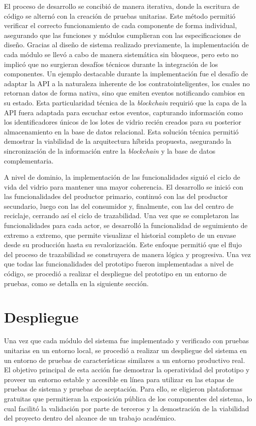 El proceso de desarrollo se concibió de manera iterativa, donde la escritura de código se alternó con la creación de pruebas unitarias. Este método permitió verificar el correcto funcionamiento de cada componente de forma individual, asegurando que las funciones y módulos cumplieran con las especificaciones de diseño. Gracias al diseño de sistema realizado previamente, la implementación de cada módulo se llevó a cabo de manera sistemática sin bloqueos, pero esto no implicó que no surgieran desafíos técnicos durante la integración de los componentes. Un ejemplo destacable durante la implementación fue el desafío de adaptar la API a la naturaleza inherente de los \glspl{contratointeligente}, los cuales no retornan datos de forma nativa, sino que emiten eventos notificando cambios en su estado. Esta particularidad técnica de la \textit{blockchain} requirió que la capa de la API fuera adaptada para escuchar estos eventos, capturando información como los identificadores únicos de los lotes de vidrio recién creados para su posterior almacenamiento en la base de datos relacional. Esta solución técnica permitió demostrar la viabilidad de la arquitectura híbrida propuesta, asegurando la sincronización de la información entre la \textit{blockchain} y la base de datos complementaria. 

A nivel de dominio, la implementación de las funcionalidades siguió el ciclo de vida del vidrio para mantener una mayor coherencia. El desarrollo se inició con las funcionalidades del productor primario, continuó con las del productor secundario, luego con las del consumidor y, finalmente, con las del centro de reciclaje, cerrando así el ciclo de \gls{trazabilidad}. Una vez que se completaron las funcionalidades para cada actor, se desarrolló la funcionalidad de seguimiento de extremo a extremo, que permite visualizar el historial completo de un envase desde su producción hasta su revalorización. Este enfoque permitió que el flujo del proceso de trazabilidad se construyera de manera lógica y progresiva. Una vez que todas las funcionalidades del prototipo fueron implementadas a nivel de código, se procedió a realizar el despliegue del prototipo en un entorno de pruebas, como se detalla en la siguiente sección.

\section{Despliegue}
\label{sec:deployment}

Una vez que cada módulo del sistema fue implementado y verificado con pruebas unitarias en un entorno local, se procedió a realizar un despliegue del sistema en un entorno de pruebas de características similares a un entorno productivo real. El objetivo principal de esta acción fue demostrar la operatividad del prototipo y proveer un entorno estable y accesible en línea para utilizar en las etapas de pruebas de sistema y pruebas de aceptación. Para ello, se eligieron plataformas gratuitas que permitieran la exposición pública de los componentes del sistema, lo cual facilitó la validación por parte de terceros y la demostración de la viabilidad del proyecto dentro del alcance de un trabajo académico.

